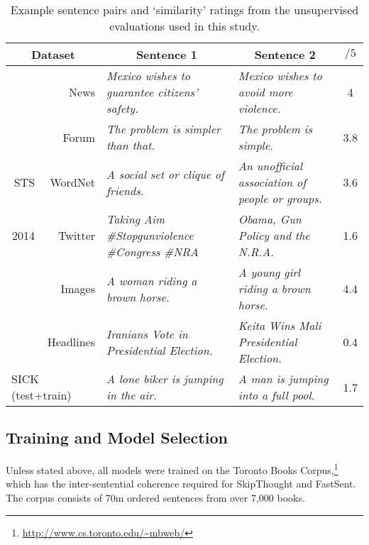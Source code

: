 \documentclass[11pt,letterpaper]{article}
\begin{document}
\begin{table*}[ht]
\begin{adjustwidth}{-0.6cm}{}
\renewcommand{\tabcolsep}{4.6pt}
\small
\newcommand{\mc}[1]{\multicolumn{1}{l|}{#1}}
  \begin{center}

      {
        \begin{tabular}{rr|l|l|c}
          \multicolumn{2}{c|}{Dataset} & \multicolumn{1}{c}{Sentence 1} &\multicolumn{1}{|c|}{Sentence 2} & \(/5\)  \\
          \hline
          \hline
           & News &  \emph{Mexico wishes to guarantee citizens' safety.} &\emph{Mexico wishes to avoid more violence.} & 4 \\
           & Forum &  \emph{The problem is simpler than that.} &  \emph{The problem is simple.}  & 3.8 \\
           STS & WordNet &  \emph{A social set or clique of friends.} &  \emph{An unofficial association of people or groups.} & 3.6 \\
           2014 & Twitter & \emph{Taking Aim  \#Stopgunviolence \#Congress \#NRA} & \emph{Obama, Gun Policy and the N.R.A.}  & 1.6 \\
            & Images & \emph{A woman riding a brown horse.} &  \emph{A young girl riding a brown horse.} & 4.4 \\
           & Headlines &  \emph{Iranians Vote in Presidential Election.} &  \emph{Keita Wins Mali Presidential Election.} & 0.4  \\
          \hline
          \multicolumn{2}{l|}{SICK (test+train)} & \emph{A lone biker is jumping in the air.} & \emph{A man is jumping into a full pool.}  & 1.7 \\
          \hline 
        \end{tabular}

    }
    \caption{\label{unsex} Example sentence pairs and `similarity' ratings from the unsupervised evaluations used in this study.}
  \end{center}
  \vspace*{-4ex}
  \end{adjustwidth}
\end{table*}

\subsection{Training and Model Selection}



Unless stated above, all models were trained on the Toronto Books Corpus,\footnote{\scriptsize \url{http://www.cs.toronto.edu/~mbweb/}} which has the inter-sentential coherence required for SkipThought and FastSent. The corpus consists of 70m ordered sentences from over 7,000 books. 
\end{document}
